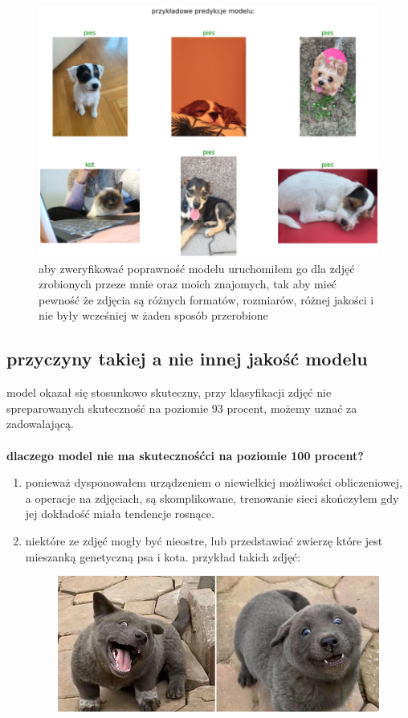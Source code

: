 \documentclass[a4paper,12pt]{scrartcl}
\begin{document}
\begin{figure}[h]
  \includegraphics[width=\linewidth]{preedictions.png}
  aby zweryfikować poprawność modelu uruchomiłem go dla zdjęć zrobionych przeze mnie oraz moich znajomych,
  tak aby mieć pewność że zdjęcia są różnych formatów, rozmiarów, różnej jakości i nie 
  były wcześniej w żaden sposób przerobione
\end{figure}
\newpage{}
\subsection{przyczyny takiej a nie innej jakość modelu}
model okazał się stosunkowo skuteczny, przy klasyfikacji 
zdjęć nie spreparowanych skuteczność na poziomie 93 
procent, możemy uznać za zadowalającą.\\\\
\textbf{dlaczego model nie ma skutecznośćci na poziomie 100 procent?}\\
\begin{enumerate}
  \item ponieważ dysponowałem urządzeniem o niewielkiej możliwości obliczeniowej,
   a operacje na zdjęciach, są skomplikowane, trenowanie sieci skończyłem gdy jej dokładość miała tendencje 
   rosnące.
  \item niektóre ze zdjęć mogły być nieostre, lub przedstawiać zwierzę które jest mieszanką genetyczną psa i kota.
  przykład takich zdjęć: 
  \begin{figure}[h]
    \includegraphics[width=\linewidth]{example.png}
  \end{figure}
\end{enumerate} 
\end{document}
